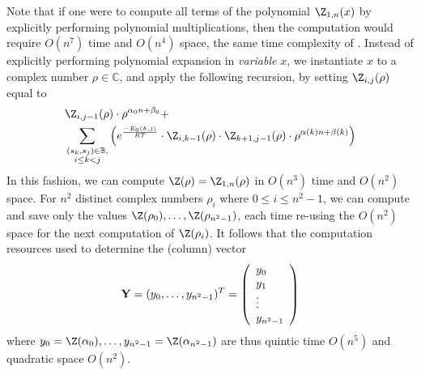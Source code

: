 Note that if one were to compute all terms of the polynomial $\Z_{1,n}(x)$
by explicitly performing polynomial multiplications,
then the computation would require $O(n^7)$ time and $O(n^4)$ space, the
same time complexity of \cite{hofacker:RNAbor2D}.
Instead of explicitly performing polynomial expansion in {\em variable} $x$,
we instantiate $x$ to a
complex number $\rho \in \mathbb{C}$, and apply
the following recursion, by setting $\Z_{i,j}(\rho)$ equal to
\begin{eqnarray}
\label{eq:RNAborNussRecursionInstantiated}
&\Z_{i,j-1}(\rho) \cdot \rho^{\alpha_0n+\beta_0} + \\
&\sum_{\substack{(s_k,s_j) \in \mathbb{B},\\i\le k<j}}
\left(e^{\frac{-E_0(k,j)}{RT}}\cdot
\Z_{i,k-1}(\rho)\cdot\Z_{k+1,j-1}(\rho)
\cdot \rho^{\alpha(k)n+\beta(k)} \right) \nonumber
\end{eqnarray}
In this fashion, we can compute $\Z(\rho)=\Z_{1,n}(\rho)$ in
$O(n^3)$ time and $O(n^2)$ space. For $n^2$ distinct complex numbers
$\rho_i$ where $0 \leq i \leq n^2-1$, we can compute and save only the
values $\Z(\rho_0),\ldots, \Z(\rho_{n^2-1})$, each time re-using the
$O(n^2)$ space for the next computation of $\Z(\rho_i)$.
It follows that
the computation resources used to determine the (column) vector
\begin{eqnarray}
\label{eq:defY}
{\bf Y} = (y_0,\ldots,y_{n^2-1})^T =
\left(
\begin{array}{l}
y_0\\
y_1\\
\vdots \\
y_{n^2-1}\\
\end{array}
\right)
\end{eqnarray}
where
$y_0=\Z(\alpha_0),\ldots, y_{n^2-1}=\Z(\alpha_{n^2-1})$ are thus
quintic time $O(n^5)$ and quadratic space $O(n^2)$.

